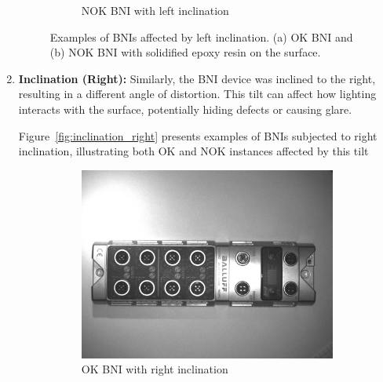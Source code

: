 \documentclass[12pt,DIV14,BCOR12mm,a4paper,footinclude=false,headinclude,parskip=half-,twoside,openright,cleardoublepage=empty,toc=index,bibliography=totoc,listof=totoc]{scrreprt}
\numberwithin{equation}{chapter}
\begin{document}
\begin{enumerate}
\begin{figure}
\begin{subfigure}[b]{0.45\textwidth}
            \caption{NOK BNI with left inclination}
        \end{subfigure}
        \caption{Examples of BNIs affected by left inclination. (a) OK BNI and (b) NOK BNI with solidified epoxy resin on the surface.}
        \label{fig:inclination_left}
    \end{figure}

    \item \textbf{Inclination (Right):} Similarly, the BNI device was inclined to the right, resulting in a different angle of distortion. This tilt can affect how lighting interacts with the surface, potentially hiding defects or causing glare.
    
	Figure~\ref{fig:inclination_right} presents examples of BNIs subjected to right inclination, illustrating both OK and NOK instances affected by this tilt
    \begin{figure}
        \centering
        \begin{subfigure}[b]{0.45\textwidth}
            \centering
            \includegraphics[scale=0.15]{../media/BNI-influence-right-OK.png}
            \caption{OK BNI with right inclination}
        \end{subfigure}
        \hfill
        \begin{subfigure}[b]{0.45\textwidth}
            \centering

\end{subfigure}
\end{figure}
\end{enumerate}
\end{document}
